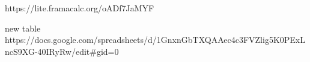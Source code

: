 \documentclass[a4paper,10pt]{article}
\begin{document}
https://lite.framacalc.org/oADf7JaMYF

new table 
https://docs.google.com/spreadsheets/d/1GnxnGbTXQAAec4c3FVZlig5K0PExLncS9XG-40IRyRw/edit#gid=0



\medskip


\end{document}

